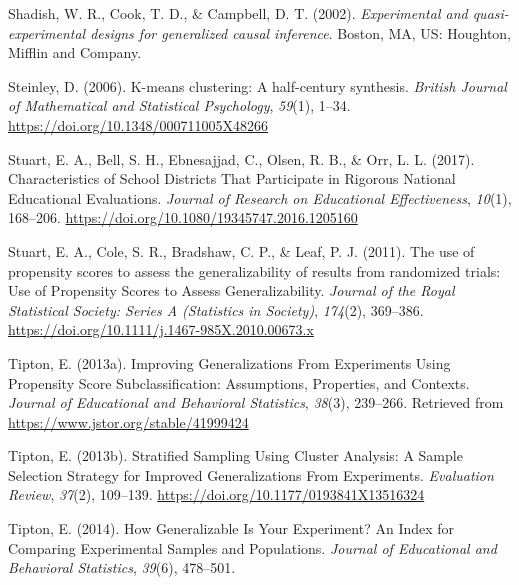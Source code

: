 \documentclass[
  english,
  man,floatsintext]{apa6}
\newlength{\cslhangindent}
\newlength{\cslentryspacingunit} %
\newenvironment{CSLReferences}[2] %
 {%
  \setlength{\parindent}{0pt}
  \ifodd #1
  \let\oldpar\par
  \def\par{\hangindent=\cslhangindent\oldpar}
  \fi
  \setlength{\parskip}{#2\cslentryspacingunit}
 }%
 {}
\begin{document}
\begin{CSLReferences}{1}{0}
\leavevmode{}%
Shadish, W. R., Cook, T. D., \& Campbell, D. T. (2002). \emph{Experimental and quasi-experimental designs for generalized causal inference}. Boston, MA, US: {Houghton, Mifflin and Company}.

\leavevmode{}%
Steinley, D. (2006). K-means clustering: {A} half-century synthesis. \emph{British Journal of Mathematical and Statistical Psychology}, \emph{59}(1), 1--34. \url{https://doi.org/10.1348/000711005X48266}

\leavevmode{}%
Stuart, E. A., Bell, S. H., Ebnesajjad, C., Olsen, R. B., \& Orr, L. L. (2017). Characteristics of {School Districts That Participate} in {Rigorous National Educational Evaluations}. \emph{Journal of Research on Educational Effectiveness}, \emph{10}(1), 168--206. \url{https://doi.org/10.1080/19345747.2016.1205160}

\leavevmode{}%
Stuart, E. A., Cole, S. R., Bradshaw, C. P., \& Leaf, P. J. (2011). The use of propensity scores to assess the generalizability of results from randomized trials: {Use} of {Propensity Scores} to {Assess Generalizability}. \emph{Journal of the Royal Statistical Society: Series A (Statistics in Society)}, \emph{174}(2), 369--386. \url{https://doi.org/10.1111/j.1467-985X.2010.00673.x}

\leavevmode{}%
Tipton, E. (2013a). Improving {Generalizations From Experiments Using Propensity Score Subclassification}: {Assumptions}, {Properties}, and {Contexts}. \emph{Journal of Educational and Behavioral Statistics}, \emph{38}(3), 239--266. Retrieved from \url{https://www.jstor.org/stable/41999424}

\leavevmode{}%
Tipton, E. (2013b). Stratified {Sampling Using Cluster Analysis}: {A Sample Selection Strategy} for {Improved Generalizations From Experiments}. \emph{Evaluation Review}, \emph{37}(2), 109--139. \url{https://doi.org/10.1177/0193841X13516324}

\leavevmode{}%
Tipton, E. (2014). How {Generalizable Is Your Experiment}? {An Index} for {Comparing Experimental Samples} and {Populations}. \emph{Journal of Educational and Behavioral Statistics}, \emph{39}(6), 478--501.


\end{CSLReferences}
\end{document}
